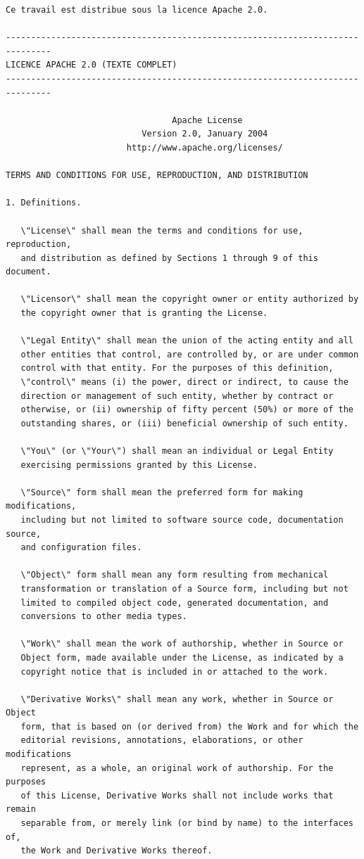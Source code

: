 \documentclass[12pt,a4paper]{article}
\begin{document}
\begin{lstlisting}[style=isabellegray]
Ce travail est distribue sous la licence Apache 2.0.

-------------------------------------------------------------------------------
LICENCE APACHE 2.0 (TEXTE COMPLET)
-------------------------------------------------------------------------------

                                 Apache License
                           Version 2.0, January 2004
                        http://www.apache.org/licenses/

TERMS AND CONDITIONS FOR USE, REPRODUCTION, AND DISTRIBUTION

1. Definitions.

   \"License\" shall mean the terms and conditions for use, reproduction,
   and distribution as defined by Sections 1 through 9 of this document.

   \"Licensor\" shall mean the copyright owner or entity authorized by
   the copyright owner that is granting the License.

   \"Legal Entity\" shall mean the union of the acting entity and all
   other entities that control, are controlled by, or are under common
   control with that entity. For the purposes of this definition,
   \"control\" means (i) the power, direct or indirect, to cause the
   direction or management of such entity, whether by contract or
   otherwise, or (ii) ownership of fifty percent (50%) or more of the
   outstanding shares, or (iii) beneficial ownership of such entity.

   \"You\" (or \"Your\") shall mean an individual or Legal Entity
   exercising permissions granted by this License.

   \"Source\" form shall mean the preferred form for making modifications,
   including but not limited to software source code, documentation source,
   and configuration files.

   \"Object\" form shall mean any form resulting from mechanical
   transformation or translation of a Source form, including but not
   limited to compiled object code, generated documentation, and
   conversions to other media types.

   \"Work\" shall mean the work of authorship, whether in Source or
   Object form, made available under the License, as indicated by a
   copyright notice that is included in or attached to the work.

   \"Derivative Works\" shall mean any work, whether in Source or Object
   form, that is based on (or derived from) the Work and for which the
   editorial revisions, annotations, elaborations, or other modifications
   represent, as a whole, an original work of authorship. For the purposes
   of this License, Derivative Works shall not include works that remain
   separable from, or merely link (or bind by name) to the interfaces of,
   the Work and Derivative Works thereof.


\end{lstlisting}
\end{document}
